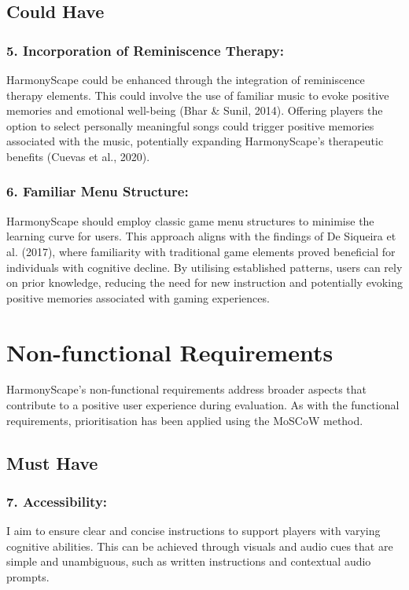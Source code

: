 \documentclass{l4proj}
\begin{document}
\subsection{Could Have}
\subsubsection{5. Incorporation of Reminiscence Therapy:} HarmonyScape could be enhanced through the integration of reminiscence therapy elements. This could involve the use of familiar music to evoke positive memories and emotional well-being (Bhar \& Sunil, 2014). Offering players the option to select personally meaningful songs could trigger positive memories associated with the music, potentially expanding HarmonyScape's therapeutic benefits (Cuevas et al., 2020).

\subsubsection{6. Familiar Menu Structure:} HarmonyScape should employ classic game menu structures to minimise the learning curve for users. This approach aligns with the findings of De Siqueira et al. (2017), where familiarity with traditional game elements proved beneficial for individuals with cognitive decline. By utilising established patterns, users can rely on prior knowledge, reducing the need for new instruction and potentially evoking positive memories associated with gaming experiences.

\section{Non-functional Requirements}
HarmonyScape's non-functional requirements address broader aspects that contribute to a positive user experience during evaluation. As with the functional requirements, prioritisation has been applied using the MoSCoW method.

\subsection{Must Have}
\subsubsection{7. Accessibility:} I aim to ensure clear and concise instructions to support players with varying cognitive abilities. This can be achieved through visuals and audio cues that are simple and unambiguous, such as written instructions and contextual audio prompts.
\end{document}
